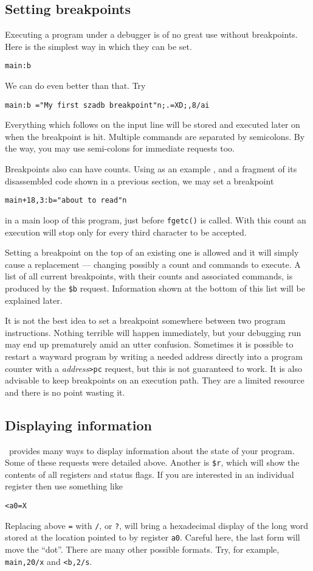 \subsection{Setting breakpoints}
Executing a program under a debugger is of no great use without breakpoints.
Here is the simplest way in which they can be set.
\begin{exmpl}
	{\tt main:b}
\end{exmpl}
We can do even better than that. Try
\begin{exmpl}
	{\tt main:b ="My first szadb breakpoint"n;.=XD;,8/ai}
\end{exmpl}
Everything which follows  on the input line will be stored and
executed later on when the breakpoint is hit.
Multiple commands are separated by semicolons.
By the way, you may use semi-colons for immediate requests too.

Breakpoints also can have counts.  Using as an example ,
and a fragment of its disassembled code shown in a previous section, we 
may set a breakpoint
\begin{exmpl}
	{\tt main+18,3:b="about to read"n}
\end{exmpl}
in a main loop of this program, just before {\tt fgetc()} is called.
With this count an execution will stop only 
for every third character to be accepted.

Setting a breakpoint on the top of an existing one is allowed and it will
simply cause a replacement --- changing possibly a count and
commands to execute.  A list of all current breakpoints, with their counts
and associated commands,  is produced by the \verb|$b| request.
Information shown at the bottom of this list will be explained later.

It is not the best idea to set a breakpoint somewhere between two program
instructions.  Nothing terrible will happen immediately,
but your debugging run may end up prematurely amid an utter confusion.
Sometimes it is possible to
restart a wayward program by writing a needed address directly into a
program counter with a {\it address}{\tt >pc} request, but this is not
guaranteed to work.  It is also advisable to keep breakpoints on an
execution path.  They are a limited resource and there is no point
wasting it.

\subsection{Displaying information}
\szadb\ provides many ways to display information about the state
of your program.  Some of these requests were detailed above. Another
is \verb|$r|, which will show the contents of all registers
and status flags. If you are interested
in an individual register then use something like
\begin{exmpl}
	{\tt <a0=X}
\end{exmpl}
Replacing above {\tt =}
with {\tt /}, or {\tt ?}, will bring a hexadecimal display of the long
word stored at the location pointed to by register {\tt a0}.
Careful here, the last form will move the ``dot''.
There are many other possible formats.
Try, for example, \hbox{{\tt main,20/x}} and \hbox{{\tt <b,2/s}}.

